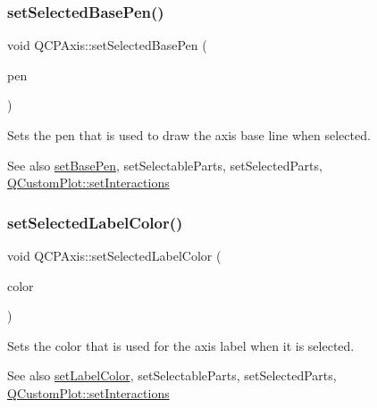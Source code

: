 \subsubsection{\texorpdfstring{set\+Selected\+Base\+Pen()}{setSelectedBasePen()}}
{\footnotesize\ttfamily void Q\+C\+P\+Axis\+::set\+Selected\+Base\+Pen (\begin{DoxyParamCaption}\item[{const Q\+Pen \&}]{pen }\end{DoxyParamCaption})}

Sets the pen that is used to draw the axis base line when selected.

\begin{DoxySeeAlso}{See also}
\hyperlink{class_q_c_p_axis_a778d45fb71b3c7ab3bb7079e18b058e4}{set\+Base\+Pen}, set\+Selectable\+Parts, set\+Selected\+Parts, \hyperlink{class_q_custom_plot_a5ee1e2f6ae27419deca53e75907c27e5}{Q\+Custom\+Plot\+::set\+Interactions} 
\end{DoxySeeAlso}
\mbox{\label{class_q_c_p_axis_a5d502dec597c634f491fdd73d151c72d}} 
\subsubsection{\texorpdfstring{set\+Selected\+Label\+Color()}{setSelectedLabelColor()}}
{\footnotesize\ttfamily void Q\+C\+P\+Axis\+::set\+Selected\+Label\+Color (\begin{DoxyParamCaption}\item[{const Q\+Color \&}]{color }\end{DoxyParamCaption})}

Sets the color that is used for the axis label when it is selected.

\begin{DoxySeeAlso}{See also}
\hyperlink{class_q_c_p_axis_a6c906fe56d75f0122335b9f79b999608}{set\+Label\+Color}, set\+Selectable\+Parts, set\+Selected\+Parts, \hyperlink{class_q_custom_plot_a5ee1e2f6ae27419deca53e75907c27e5}{Q\+Custom\+Plot\+::set\+Interactions} 
\end{DoxySeeAlso}
\mbox{\label{class_q_c_p_axis_a02ec2a75d4d8401eaab834fbc6803d30}} 
